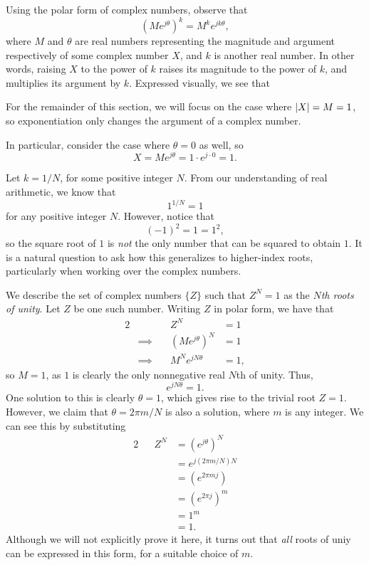 \documentclass[letterpaper]{article}
\theoremstyle{remark}
\newcommand{\eqn}[1]{\begin{alignat*}{2}#1\end{alignat*}}
\newcommand*{\thus}{&\implies\quad&}
\begin{document}
Using the polar form of complex numbers, observe that
\[
    (Me^{j\theta})^k = M^k e^{jk\theta},
\]
where $M$ and $\theta$ are real numbers representing the magnitude and argument respectively of some complex number $X$, and $k$ is another real number. In other words, raising $X$ to the power of $k$ raises its magnitude to the power of $k$, and multiplies its argument by $k$. Expressed visually, we see that
\begin{center}
\end{center}

For the remainder of this section, we will focus on the case where $\abs{X} = M = 1$, so exponentiation only changes the argument of a complex number.

In particular, consider the case where $\theta = 0$ as well, so
\[
    X = Me^{j\theta} = 1 \cdot e^{j \cdot 0} = 1.
\]

Let $k = 1 / N$, for some positive integer $N$. From our understanding of real arithmetic, we know that
\[
    1^{1/N} = 1
\]
for any positive integer $N$. However, notice that
\[
    (-1)^2 = 1 = 1^2,
\]
so the square root of $1$ is \emph{not} the only number that can be squared to obtain $1$. It is a natural question to ask how this generalizes to higher-index roots, particularly when working over the complex numbers.

We describe the set of complex numbers $\{ Z \}$ such that $Z^N = 1$ as the \emph{$N$th roots of unity}. Let $Z$ be one such number. Writing $Z$ in polar form, we have that
\eqn{
    && Z^N &= 1 \\
    \thus (Me^{j\theta})^N &= 1 \\
    \thus M^N e^{jN\theta} &= 1,
}
so $M = 1$, as $1$ is clearly the only nonnegative real $N$th of unity. Thus,
\[
    e^{jN\theta} = 1.
\]
One solution to this is clearly $\theta = 1$, which gives rise to the trivial root $Z = 1$. However, we claim that $\theta = 2\pi m / N$ is also a solution, where $m$ is any integer. We can see this by substituting
\eqn{
    && Z^N &= (e^{j\theta})^N \\
    &&&= e^{j(2\pi m / N) N} \\
    &&&= (e^{2 \pi m j}) \\
    &&&= (e^{2 \pi j})^m \\
    &&&= 1^m \\
    &&&= 1.
}
Although we will not explicitly prove it here, it turns out that \emph{all} roots of uniy can be expressed in this form, for a suitable choice of $m$.
\end{document}
